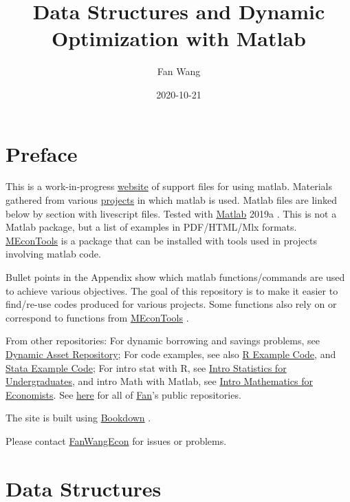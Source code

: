 \documentclass[
]{book}
\title{Data Structures and Dynamic Optimization with Matlab}
\author{Fan Wang}
\date{2020-10-21}
\begin{document}
\maketitle

{
\hypersetup{linkcolor=}
\setcounter{tocdepth}{2}
\tableofcontents
}
\hypertarget{preface}{%
\chapter*{Preface}\label{preface}}

This is a work-in-progress \href{https://fanwangecon.github.io/M4Econ/}{website} of support files for using matlab. Materials gathered from various \href{https://fanwangecon.github.io/research}{projects} in which matlab is used. Matlab files are linked below by section with livescript files. Tested with \href{https://www.mathworks.com/products/matlab.html}{Matlab} 2019a \citep{matlab}. This is not a Matlab package, but a list of examples in PDF/HTML/Mlx formats. \href{https://github.com/FanWangEcon/MEconTools}{MEconTools} is a package that can be installed with tools used in projects involving matlab code.

Bullet points in the Appendix show which matlab functions/commands are used to achieve various objectives. The goal of this repository is to make it easier to find/re-use codes produced for various projects. Some functions also rely on or correspond to functions from \href{https://github.com/FanWangEcon/MEconTools}{MEconTools} \citep{M-MEconTools}.

From other repositories: For dynamic borrowing and savings problems, see \href{https://fanwangecon.github.io/CodeDynaAsset/}{Dynamic Asset Repository}; For code examples, see also \href{https://fanwangecon.github.io/R4Econ/}{R Example Code}, and \href{https://fanwangecon.github.io/Stata4Econ/}{Stata Example Code}; For intro stat with R, see \href{https://fanwangecon.github.io/Stat4Econ/}{Intro Statistics for Undergraduates}, and intro Math with Matlab, see \href{https://fanwangecon.github.io/Math4Econ/}{Intro Mathematics for Economists}. See \href{https://github.com/FanWangEcon}{here} for all of \href{https://fanwangecon.github.io/}{Fan}'s public repositories.

The site is built using \href{https://bookdown.org/}{Bookdown} \citep{R-bookdown}.

Please contact \href{https://fanwangecon.github.io/}{FanWangEcon} for issues or problems.

\hypertarget{data-structures}{%
\chapter{Data Structures}\label{data-structures}}
\end{document}
